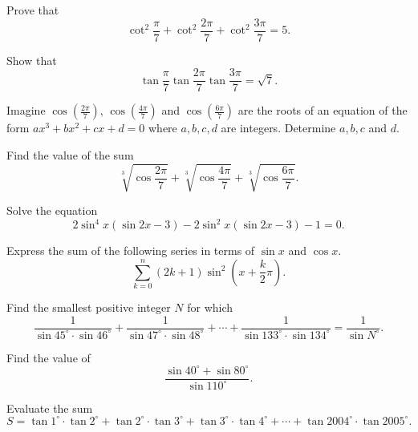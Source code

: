 \documentclass[12pt,a4paper]{memoir}
\theoremstyle{definition}
\begin{document}
\begin{question} Prove that $$\cot^2 \frac{\pi}{7}+\cot^2 \frac{2\pi}{7}+\cot^2 \frac{3\pi}{7}=5.$$
\end{question}


\begin{question} Show that $$\tan{\frac {\pi}7}\tan{\frac {2\pi}7}\tan{\frac {3\pi}7}=\sqrt 7.$$
\end{question}



\begin{question} Imagine $\cos\left(\frac{2\pi}{7}\right)$, $\cos\left(\frac{4\pi}{7}\right)$ and $\cos\left(\frac{6\pi}{7}\right)$ are the roots of an equation of the form $ax^3+bx^2+cx+d = 0$ where $a, b, c, d$ are integers. Determine $a, b, c$ and $d$.
\end{question}



\begin{question} Find the value of the sum
	\[\sqrt[3]{\cos{\frac{2\pi}{7}}} + \sqrt[3]{\cos\frac{4\pi}{7}} + \sqrt[3]{\cos\frac{6\pi}{7}}.\]
\end{question}



\begin{question} Solve the equation \[2\sin^4x(\sin 2x-3)-2\sin^2x(\sin 2x-3)-1=0.\]
\end{question}



\begin{question} Express the sum of the following series in terms of $\sin x$ and $\cos x.$
	\[\sum_{k=0}^n (2k+1)\sin ^ 2 \left(x+\frac{k}{2}\pi\right).\]
\end{question}



\begin{question} Find the smallest positive integer $N$ for which
	\[\frac{1}{\sin 45^\circ \cdot  \sin 46^\circ} + \frac{1}{\sin 47^\circ \cdot  \sin 48^\circ} +\cdots +\frac{1}{\sin 133^\circ \cdot  \sin 134^\circ} = \frac{1}{\sin N^\circ}.\]
\end{question}



\begin{question} Find the value of
	\[\frac{\sin 40^\circ + \sin 80^\circ}{\sin 110^\circ}.\]
\end{question}


\begin{question} Evaluate the sum \[ S=\tan 1^\circ  \cdot \tan 2^\circ + \tan 2^\circ  \cdot \tan 3^\circ +\tan 3^\circ  \cdot \tan 4^\circ +\cdots + \tan 2004^\circ  \cdot \tan 2005^\circ.\]
\end{question}
\end{document}
